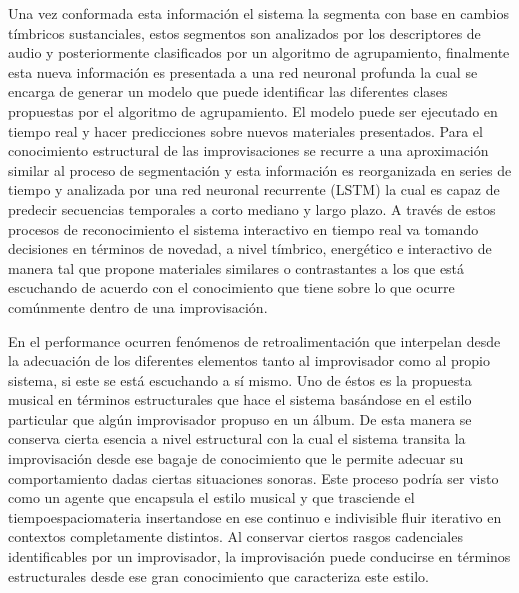 Una vez conformada esta información el sistema la segmenta con base en cambios tímbricos sustanciales, estos segmentos son analizados por los descriptores de audio y posteriormente clasificados por un algoritmo de agrupamiento, finalmente esta nueva información es presentada a una red neuronal profunda la cual se encarga de generar un modelo que puede identificar las diferentes clases propuestas por el algoritmo de agrupamiento. El modelo puede ser ejecutado en tiempo real y hacer predicciones sobre nuevos materiales presentados. Para el conocimiento estructural de las improvisaciones se recurre a una aproximación similar al proceso de segmentación y esta información es reorganizada en series de tiempo y analizada por una red neuronal recurrente (LSTM) la cual es capaz de predecir secuencias temporales a corto mediano y largo plazo. A través de estos procesos de reconocimiento el sistema interactivo en tiempo real va tomando decisiones en términos de novedad, a nivel tímbrico, energético e interactivo de manera tal que propone materiales similares o contrastantes a los que está escuchando de acuerdo con el conocimiento que tiene sobre lo que ocurre comúnmente dentro de una improvisación. 

En el performance ocurren fenómenos de retroalimentación que interpelan desde la adecuación de los diferentes elementos tanto al improvisador como al propio sistema, si este se está escuchando a sí mismo. Uno de éstos es la propuesta musical en términos estructurales que hace el sistema basándose en el estilo particular que algún improvisador propuso en un álbum. De esta manera se conserva cierta esencia a nivel estructural con la cual el sistema transita la improvisación desde ese bagaje de conocimiento que le permite adecuar su comportamiento dadas ciertas situaciones sonoras. Este proceso podría ser visto como un agente que encapsula el estilo musical  y que trasciende el tiempoespaciomateria insertandose en ese continuo e indivisible fluir iterativo en contextos completamente distintos. Al conservar ciertos rasgos cadenciales identificables por un improvisador, la improvisación puede conducirse en términos estructurales desde ese gran conocimiento que caracteriza este estilo.

